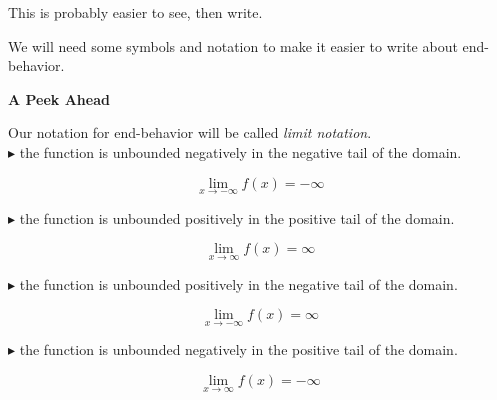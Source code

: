 \documentclass{ximera}
\begin{document}
This is probably easier to see, then write.



\begin{image}
\end{image}


We will need some symbols and notation to make it easier to write about end-behavior. \\



\begin{notation}  \textbf{\textcolor{red!70!black}{A Peek Ahead}}

Our notation for end-behavior will be called \textit{limit notation}. \\



\textbf{\textcolor{blue!55!black}{$\blacktriangleright$}} the function is unbounded negatively in the negative tail of the domain.

\[
\lim\limits_{x \to -\infty} f(x) = -\infty
\]


\textbf{\textcolor{blue!55!black}{$\blacktriangleright$}} the function is unbounded positively in the positive tail of the domain.

\[
\lim\limits_{x \to \infty} f(x) = \infty
\]


\textbf{\textcolor{blue!55!black}{$\blacktriangleright$}} the function is unbounded positively in the negative tail of the domain.

\[
\lim\limits_{x \to -\infty} f(x) = \infty
\]


\textbf{\textcolor{blue!55!black}{$\blacktriangleright$}} the function is unbounded negatively in the positive tail of the domain.

\[
\lim\limits_{x \to \infty} f(x) = -\infty
\]


\end{notation}
\end{document}

